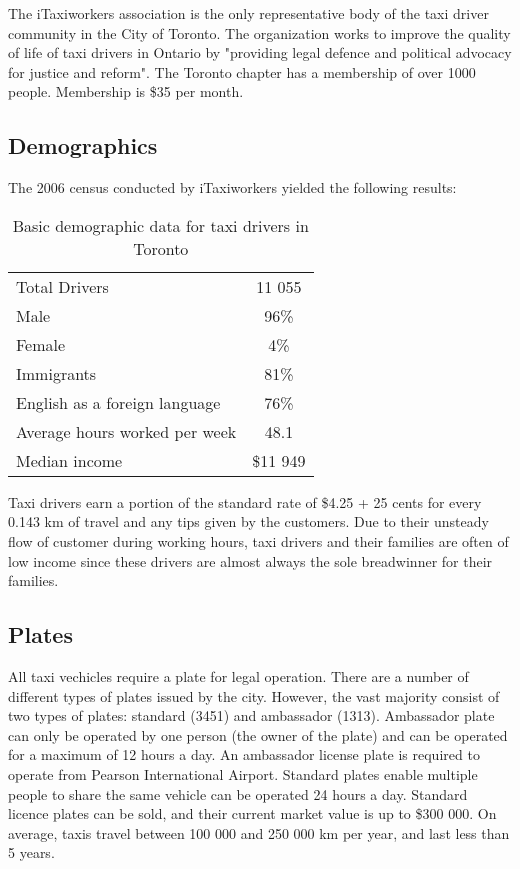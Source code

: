 \documentclass[11pt]{article}
\begin{document}
The iTaxiworkers association is the only representative body of the taxi driver community in the City of Toronto. 
The organization works to improve the quality of life of taxi drivers in Ontario by "providing legal defence
and political advocacy for justice and reform"\cite{iTaxiWorkers2012}. The Toronto chapter
has a membership of over 1000 people. Membership is \$35 per month\cite{iTaxi2012, Abdiemail}.

\subsection{Demographics}
The 2006 census conducted by iTaxiworkers yielded the following results\cite{iTaxiWorkers2012}:
\begin{table}[h]
\centering
\caption{Basic demographic data for taxi drivers in Toronto}
\begin{tabular}{l c}
 Total Drivers & 11 055 \\
 Male & 96\% \\
 Female & 4\% \\
 Immigrants & 81\% \\
 English as a foreign language & 76\% \\
 Average hours worked per week & 48.1 \\
 Median income & \$11 949 \\
\end{tabular}
\end{table}

Taxi drivers earn a portion of the standard rate of \$4.25 + 25 cents for every 0.143 km of 
travel\cite{thestar2012} and any tips given by the customers. Due to their unsteady flow of 
customer during working hours, taxi drivers and their families are often of low income since these 
drivers are almost always the sole breadwinner for their families\cite{Abdiphone}.

\subsection{Plates}
All taxi vechicles require a plate for legal operation. There are a number of different types of plates issued by the city. However, the vast majority 
consist of two types of plates: standard (3451) and ambassador (1313)\cite{thestat2012}. 
Ambassador plate can only be operated by one person (the owner of the plate) and can be 
operated for a maximum of 12 hours a day. An ambassador license plate is required to 
operate from Pearson International Airport. Standard plates enable multiple people to share the same vehicle 
can be operated 24 hours a day. Standard licence plates can be sold, and their
current market value is up to \$300 000\cite{thestar2012}. On average, taxis travel between 100 000 and 
250 000 km per year\cite{thestar2012}, and last less than 5 years\cite{thestar}. 
\end{document}
